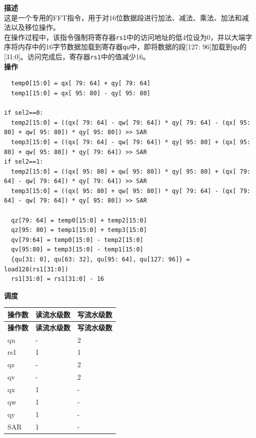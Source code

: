 \textbf{描述}\\
这是一个专用的FFT指令，用于对16位数据段进行加法、减法、乘法、加法和减法以及移位操作。\\
在操作过程中，该指令强制将寄存器\lstinline{rs1}中的访问地址的低4位设为0，并以大端字序将内存中的16字节数据加载到寄存器\lstinline{qu}中，即将数据的段[127: 96]加载到\lstinline{qu}的[31:0]。访问完成后，寄存器\lstinline{rs1}中的值减少16。\\
\textbf{操作}
\begin{lstlisting}
  temp0[15:0] = qx[ 79: 64] + qy[ 79: 64]
  temp1[15:0] = qx[ 95: 80] - qy[ 95: 80]

if sel2==0:
  temp2[15:0] = ((qx[ 79: 64] - qw[ 79: 64]) * qy[ 79: 64] - (qx[ 95: 80] + qw[ 95: 80]) * qy[ 95: 80]) >> SAR
  temp3[15:0] = ((qx[ 79: 64] - qw[ 79: 64]) * qy[ 95: 80] + (qx[ 95: 80] + qw[ 95: 80]) * qy[ 79: 64]) >> SAR
if sel2==1:
  temp2[15:0] = ((qx[ 95: 80] + qw[ 95: 80]) * qy[ 95: 80] + (qx[ 79: 64] - qw[ 79: 64]) * qy[ 79: 64]) >> SAR
  temp3[15:0] = ((qx[ 95: 80] + qw[ 95: 80]) * qy[ 79: 64] - (qx[ 79: 64] - qw[ 79: 64]) * qy[ 95: 80]) >> SAR

  qz[79: 64] = temp0[15:0] + temp2[15:0]
  qz[95: 80] = temp1[15:0] + temp3[15:0]
  qv[79:64] = temp0[15:0] - temp2[15:0]
  qv[95:80] = temp3[15:0] - temp1[15:0]
  {qu[31: 0], qu[63: 32], qu[95: 64], qu[127: 96]} = load128(rs1[31:0])
  rs1[31:0] = rs1[31:0] - 16
\end{lstlisting}

\textbf{调度}\\
\begin{longtable}[c]{|l|l|l|}
    \hline
    \rowcolor{lightgray}
    \textbf{操作数} & \textbf{读流水级数} & \textbf{写流水级数} \\\hline
    \endfirsthead
    \hline
    \rowcolor{lightgray}
     \textbf{操作数} & \textbf{读流水级数} & \textbf{写流水级数} \\\hline
    \endhead
    \hline
    \endfoot

  qu & - & 2 \\\hline
  rs1 & 1 & 1 \\\hline
  qz & - & 2 \\\hline
  qv & - & 2 \\\hline
  qx & 1 & - \\\hline
  qw & 1 & - \\\hline
  qy & 1 & - \\\hline
  SAR & 1 & -

\end{longtable}

